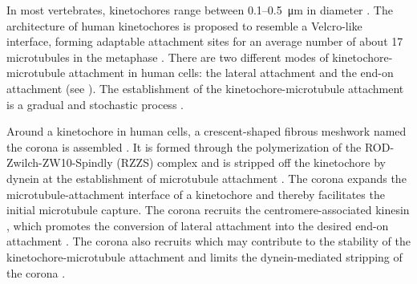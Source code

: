 In most vertebrates, kinetochores range between 0.1--\SI{0.5}{\micro m} in diameter \cite{Rieder+Salmon1998}. The architecture of human kinetochores is proposed to resemble a Velcro-like interface, forming adaptable attachment sites for an average number of about 17 microtubules in the metaphase \cite{Wendell1993, Zaytsev2014, Zaytsev2015, Velcro, Kukreja2020}. There are two different modes of kinetochore-microtubule attachment in human cells: the lateral attachment and the end-on attachment (see ). The establishment of the kinetochore-microtubule attachment is a gradual and stochastic process \cite{GradualStochastic}.


Around a kinetochore in human cells, a crescent-shaped fibrous meshwork named the corona is assembled \cite{CoronaReview_Kops+Gassman2020}. It is formed through the polymerization of the ROD-Zwilch-ZW10-Spindly (RZZS) complex \cite{RZZS_Sacristan2018, RZZS_Raisch2022} and is stripped off the kinetochore by dynein at the establishment of microtubule attachment \cite{DyneinStripsCorona}. The corona expands the microtubule-attachment interface of a kinetochore and thereby facilitates the initial microtubule capture. The corona recruits the centromere-associated kinesin , which promotes the conversion of lateral attachment into the desired end-on attachment \cite{Corona-CENP-E_Yao1997, GSK923295MonastrolCotreatment, CENPEActivity-BUBR1}. The corona also recruits  which may contribute to the stability of the kinetochore-microtubule attachment and limits the dynein-mediated stripping of the corona \cite{CENP-FLimitsStripping}.

